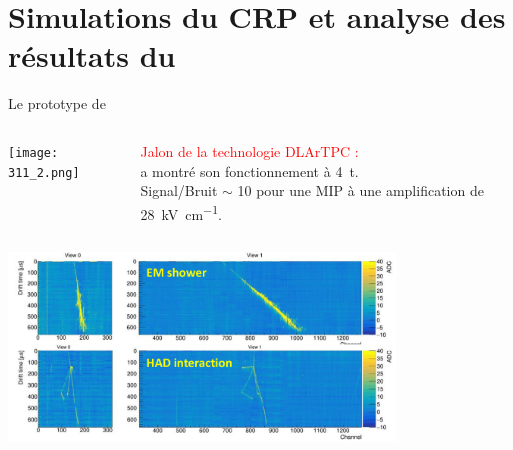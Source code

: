     \section[\TOO{}]{Simulations du CRP et analyse des résultats du \TOO{}}

    \begin{frame}{Le prototype de \TOO{}}
		\begin{columns}
			\begin{column}{0.48\textwidth}
				\centering
				\texttt{[image: 311\_2.png]}
			\end{column}\hfill
			\begin{column}{0.48\textwidth}
				\begin{scriptsize}
					\textcolor{red}{Jalon de la technologie DLArTPC :} \\ a montré son fonctionnement à \SI{4}{\tonne}.\\
					Signal/Bruit $\sim$ 10 pour une MIP à une amplification de \SI{28}{\kilo\volt\per\centi\meter}.
				\end{scriptsize}
			\end{column}\hfill
		\end{columns}
		\centering
		\includegraphics[width=0.77\textwidth]{./pictures/events.png}\\
	\end{frame}
	    
